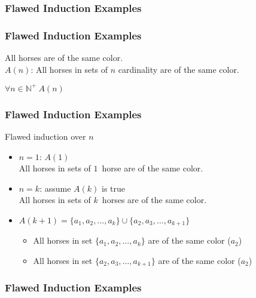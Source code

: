 \documentclass[dvipsnames]{beamer}
\begin{document}
\begin{frame}
  \frametitle{Flawed Induction Examples}

  \begin{center}
  \end{center}
\end{frame}

\begin{frame}
  \frametitle{Flawed Induction Examples}

  \begin{theorem}
    All horses are of the same color.\\
    \pause
    \bigskip
    $A(n)$: All horses in sets of $n$ cardinality are of the same color.

    \medskip
    $\forall n \in \mathbb{N^+}~A(n)$
  \end{theorem}
\end{frame}

\begin{frame}
  \frametitle{Flawed Induction Examples}

  \begin{block}{Flawed induction over $n$}
    \begin{itemize}
      \item $n=1$: $A(1)$\\
        All horses in sets of $1$~horse are of the same color.

      \pause
      \medskip
      \item $n=k$: assume $A(k)$ is true\\
        All horses in sets of $k$~horses are of the same color.
      \pause
      \medskip
      \item $A(k+1)=\{a_1,a_2,\dots,a_k\} \cup \{a_2,a_3,\dots,a_{k+1}\}$
      \begin{itemize}
        \item All horses in set $\{a_1,a_2,\dots,a_k\}$ are of the same color ($a_2$)
        \item All horses in set $\{a_2,a_3,\dots,a_{k+1}\}$ are of the same color
          ($a_2$)
      \end{itemize}
    \end{itemize}
  \end{block}
\end{frame}

\begin{frame}
  \frametitle{Flawed Induction Examples}

  \begin{center}
  \end{center}
\end{frame}
\end{document}
